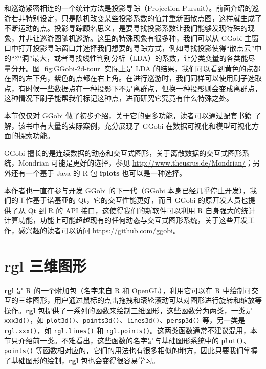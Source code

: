 \documentclass[
  b5paper,
  UTF8,twoside]{book}
\begin{document}
和巡游紧密相连的一个统计方法是投影寻踪（Projection Pursuit）。前面介绍的巡游若非特别设定，只是随机改变某些投影系数的值并重新画散点图，这样就生成了不断运动的点。投影寻踪顾名思义，是要寻找投影系数让我们能够发现特殊的现象，并非让巡游图随机巡游。这里的特殊现象有很多种，我们可以从 GGobi 主窗口中打开投影寻踪窗口并选择我们想要的寻踪方式，例如寻找投影使得``散点云''中的``空洞''最大，或者寻找线性判别分析（LDA）的系数，让分类变量的各类能尽量分开。图 \ref{fig:GGobi-2d-tour} 实际上是 LDA 的结果，我们可以看到黄色的点都在图的左下角，紫色的点都在右上角。在进行巡游时，我们同样可以使用刷子选取点，有时候一些数据点在一种投影下不是离群点，但换一种投影则会变成离群点，这种情况下刷子能帮我们标记这种点，进而研究它究竟有什么特殊之处。

本节仅仅对 GGobi 做了初步介绍，关于它的更多功能，读者可以通过配套书籍 \citet{Cook07} 了解，该书中有大量的实际案例，充分展现了 GGobi 在数据可视化和模型可视化方面的探索功能。

GGobi 擅长的是连续数据的动态和交互式图形，关于离散数据的交互式图形系统，Mondrian \citep{Theus02} 可能是更好的选择，参见 \url{http://www.theusrus.de/Mondrian/}；另外还有一个基于 Java 的 R 包 \textbf{iplots} \citep{iplots} 也可以是一种选择。

本作者也一直在参与开发 GGobi 的下一代（GGobi 本身已经几乎停止开发），我们的工作基于诺基亚的 Qt，它的交互性能更好，而且 GGobi 的原开发人员也提供了从 Qt 到 R 的 API 接口，这使得我们的新软件可以利用 R 自身强大的统计计算功能，功能上可能超越现有的任何动态与交互式图形系统，关于这些开发工作，感兴趣的读者可以访问 \url{https://github.com/ggobi}。

\section{rgl 三维图形}\label{sec:rgl}

\textbf{rgl} 是 R 的一个附加包（名字来自 R 和 \href{https://www.opengl.org/}{OpenGL}），利用它可以在 R 中绘制可交互的三维图形，用户通过鼠标的点击拖拽和滚轮滚动可以对图形进行旋转和缩放等操作。\textbf{rgl} 包提供了一系列的函数来绘制三维图形，这些函数分为两类，一类是 \texttt{xxx3d()}，如 \texttt{plot3d()}、\texttt{points3d()}、\texttt{lines3d()}、\texttt{persp3d()} 等，另一类是 \texttt{rgl.xxx()}，如 \texttt{rgl.lines()} 和 \texttt{rgl.points()}。这两类函数通常不建议混用，本节只介绍前一类。不难看出，这些函数的名字是与基础图形系统中的 \texttt{plot()}、\texttt{points()} 等函数相对应的，它们的用法也有很多相似的地方，因此只要我们掌握了基础图形的绘制，\textbf{rgl} 包也会变得很容易学习。
\end{document}
